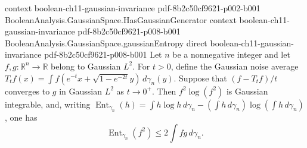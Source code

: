 \begin{theorem}
  {context}
  {boolean-ch11-gaussian-invariance}
  {pdf-8b2c50cf9621-p002-b001}
\proofstep
  {BooleanAnalysis.GaussianSpace.HasGaussianGenerator}
  {context}
  {boolean-ch11-gaussian-invariance}
  {pdf-8b2c50cf9621-p008-b001}
\proofstep
  {BooleanAnalysis.GaussianSpace.gaussianEntropy}
  {direct}
  {boolean-ch11-gaussian-invariance}
  {pdf-8b2c50cf9621-p008-b001}
Let $n$ be a nonnegative integer and let $f,g:\mathbb R^n\to\mathbb R$ belong to
Gaussian $L^2$. For $t>0$, define the Gaussian noise average $T_t f(x)=\int
f(e^{-t}x+\sqrt{1-e^{-2t}}y)\,d\gamma_n(y)$. Suppose that $(f-T_t f)/t$ converges to $g$
in Gaussian $L^2$ as $t\to0^+$. Then $f^2\log(f^2)$ is Gaussian integrable, and, writing
$\operatorname{Ent}_{\gamma_n}(h)=\int h\log h\,d\gamma_n-(\int h\,d\gamma_n)\log(\int
h\,d\gamma_n)$, one has
\[
\operatorname{Ent}_{\gamma_n}(f^2)\le 2\int fg\,d\gamma_n.
\]
\end{theorem}

